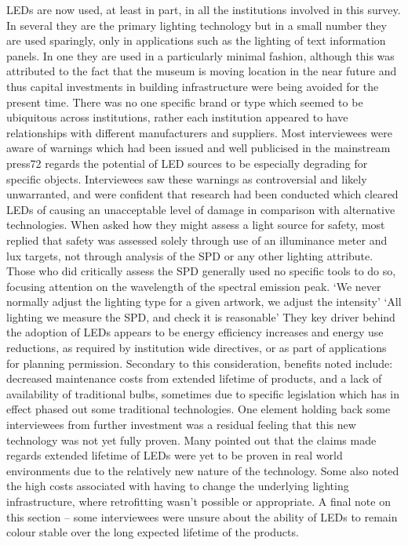 LEDs are now used, at least in part, in all the institutions involved in this survey. In several they are the primary lighting technology but in a small number they are used sparingly, only in applications such as the lighting of text information panels. In one they are used in a particularly minimal fashion, although this was attributed to the fact that the museum is moving location in the near future and thus capital investments in building infrastructure were being avoided for the present time. There was no one specific brand or type which seemed to be ubiquitous across institutions, rather each institution appeared to have relationships with different manufacturers and suppliers.
Most interviewees were aware of warnings which had been issued and well publicised in the mainstream press72 regards the potential of LED sources to be especially degrading for specific objects. Interviewees saw these warnings as controversial and likely unwarranted, and were confident that research had been conducted which cleared LEDs of causing an unacceptable level of damage in comparison with alternative technologies. When asked how they might assess a light source for safety, most replied that safety was assessed solely through use of an illuminance meter and lux targets, not through analysis of the \gls{SPD} or any other lighting attribute. Those who did critically assess the \gls{SPD} generally used no specific tools to do so, focusing attention on the wavelength of the spectral emission peak.
`We never normally adjust the lighting type for a given artwork, we adjust the intensity'
`All lighting we measure the \gls{SPD}, and check it is reasonable'
They key driver behind the adoption of LEDs appears to be energy efficiency increases and energy use reductions, as required by institution wide directives, or as part of applications for planning permission. Secondary to this consideration, benefits noted include: decreased maintenance costs from extended lifetime of products, and a lack of availability of traditional bulbs, sometimes due to specific legislation which has in effect phased out some traditional technologies. One element holding back some interviewees from further investment was a residual feeling that this new technology was not yet fully proven. Many pointed out that the claims made regards extended lifetime of LEDs were yet to be proven in real world environments due to the relatively new nature of the technology. Some also noted the high costs associated with having to change the underlying lighting infrastructure, where retrofitting wasn't possible or appropriate. A final note on this section – some interviewees were unsure about the ability of LEDs to remain colour stable over the long expected lifetime of the products.
